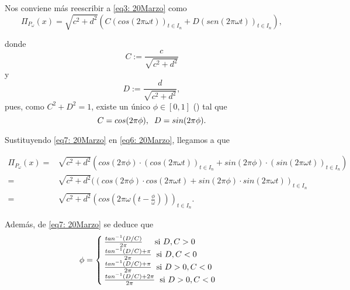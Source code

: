 \noindent 
Nos conviene más reescribir a \eqref{eq3: 20Marzo} como
\begin{equation}
\label{eq6: 20Marzo}
\Pi_{P_{\omega}}(x)= 
\sqrt{c^{2}+d^{2}}
\left(
C (cos (2 \pi \omega t))_{t \in I_{n}} +
D (sen (2 \pi \omega t))_{t \in I_{n}} 
\right),
\end{equation}

\noindent 
donde
\[
C:= \frac{c}{\sqrt{c^{2}+d^{2}}}
\]
y 
\[
D:= \frac{d}{\sqrt{c^{2}+d^{2}}},
\]
pues, como $C^{2} + D^{2}=1$, existe un único
$\phi \in [0,1]$ () tal que
\begin{equation}
\label{eq7: 20Marzo}
C= cos(2 \pi \phi), \hspace{0.2cm} 
D= sin(2 \pi \phi).
\end{equation}

Sustituyendo \eqref{eq7: 20Marzo} en \eqref{eq6: 20Marzo},
llegamos a que

\begin{align*}
\Pi_{P_{\omega}}(x) = & 
\sqrt{c^{2}+d^{2}} \left(
cos(2 \pi \phi) \cdot (cos (2 \pi \omega t))_{t \in I_{n}} +
sin(2 \pi \phi) \cdot (sin (2 \pi \omega t))_{t \in I_{n}} 
\right) \\
= & 
\sqrt{c^{2}+d^{2}} 
((cos(2 \pi \phi) \cdot cos (2 \pi \omega t) +
sin(2 \pi \phi) \cdot sin (2 \pi \omega t) )_{t \in I_{n}} \\
= & 
\sqrt{c^{2}+d^{2}} 
\left(
cos \left( 2 \pi \omega \left( t - \frac{\phi}{\omega}
\right) 
\right) 
\right)_{t \in I_{n}}.
\end{align*}

Además, de \eqref{eq7: 20Marzo} se deduce que
$$
\phi =
\begin{cases}
\frac{tan^{-1}(D/C) }{2 \pi}  \hspace{0.4cm}    \text{   si }   D, C > 0  \\
\frac{tan^{-1}(D/C) + \pi }{2 \pi} \hspace{0.2cm}  \text{si }  D, C < 0  \\
\frac{tan^{-1}(D/C) + \pi }{2 \pi} \hspace{0.2cm}  \text{si }  D>0,  C < 0  \\
\frac{tan^{-1}(D/C) + 2\pi }{2 \pi} \hspace{0.2cm}  \text{si }  D>0,  C < 0 
\end{cases}
$$


